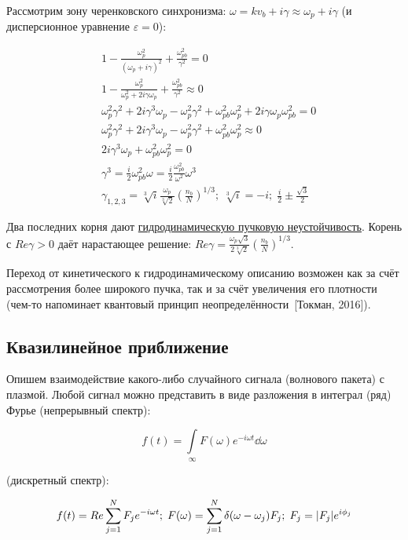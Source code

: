\documentclass[10pt, a4paper]{article}
\newcommand{\Tokman}{~[Токман, 2016]}
\begin{document}
Рассмотрим зону черенковского синхронизма: $\omega = kv_b+i\gamma\approx \omega_p+i\gamma$ (и дисперсионное уравнение $\varepsilon = 0$):

\begin{align*}
	&1 - \frac{\omega_p^2}{(\omega_p+i\gamma)^2} + \frac{\omega_{pb}^2}{\gamma^2} = 0 \\
	&1 - \frac{\omega_p^2}{\omega_p^2 + 2i\gamma\omega_p} + \frac{\omega_{pb}^2}{\gamma^2} \approx 0 \\
	&\omega_p^2\gamma^2 + 2i\gamma^3\omega_p-\omega_p^2\gamma^2 + \omega_{pb}^2\omega_p^2 + 2i\gamma\omega_p\omega_{pb}^2 = 0 \\
	&\omega_p^2\gamma^2 + 2i\gamma^3\omega_p-\omega_p^2\gamma^2 + \omega_{pb}^2\omega_p^2 \approx 0 \\
	&2i\gamma^3\omega_p + \omega_{pb}^2\omega_p^2 = 0 \\
	&\gamma^3 = \frac{i}{2} \omega_{pb}^2\omega = \frac{i}{2} \frac{\omega_{pb}^2}{\omega^2}\omega^3 \\
	&\gamma_{1,2,3} = \sqrt[3]{i} \frac{\omega_p}{\sqrt[3]{2}}\left(\frac{n_b}{N}\right)^{1/3};\;\sqrt[3]{i} = -i;\;\frac{i}{2}\pm\frac{\sqrt{3}}{2}
\end{align*}

Два последних корня дают \uline{гидродинамическую пучковую неустойчивость}. Корень с $Re\gamma>0$ даёт нарастающее решение: $Re\gamma = \frac{\omega_p\sqrt{3}}{2\sqrt[3]{2}}\left(\frac{n_b}{N}\right)^{1/3}$.

Переход от кинетического к гидродинамическому описанию возможен как за счёт рассмотрения более широкого пучка, так и за счёт увеличения его плотности (чем-то напоминает квантовый принцип неопределённости\Tokman).	

\subsection{Квазилинейное приближение} \label{subsec:quasiclassic}

Опишем взаимодействие какого-либо случайного сигнала (волнового пакета) с плазмой. Любой сигнал можно представить в виде разложения в интеграл (ряд) Фурье (непрерывный спектр):

\begin{equation*}
	f(t) = \int\limits_\infty F(\omega)e^{-i\omega t}\dd{\omega}
\end{equation*}

(дискретный спектр):

\begin{equation*}
	f(t) = Re\sum\limits_{j=1}^N F_je^{-i\omega t};\;F(\omega) = \sum\limits_{j=1}^N \delta(\omega-\omega_j)F_j;\;F_j = \abs{F_j}e^{i\phi_j}
\end{equation*}
\end{document}

